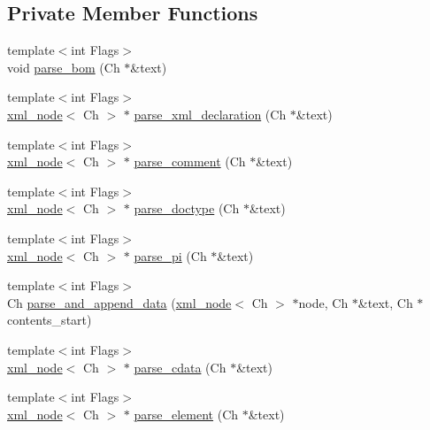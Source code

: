 \subsection*{Private Member Functions}
\begin{DoxyCompactItemize}
\item 
{\footnotesize template$<$int Flags$>$ }\\void \hyperlink{singletonrapidxml_1_1xml__document_aaa63a0c7b57ab8fce63d4aebe4da123d}{parse\+\_\+bom} (Ch $\ast$\&text)
\item 
{\footnotesize template$<$int Flags$>$ }\\\hyperlink{singletonrapidxml_1_1xml__node}{xml\+\_\+node}$<$ Ch $>$ $\ast$ \hyperlink{singletonrapidxml_1_1xml__document_a0151c52c82ba79ea0605c2facf39c534}{parse\+\_\+xml\+\_\+declaration} (Ch $\ast$\&text)
\item 
{\footnotesize template$<$int Flags$>$ }\\\hyperlink{singletonrapidxml_1_1xml__node}{xml\+\_\+node}$<$ Ch $>$ $\ast$ \hyperlink{singletonrapidxml_1_1xml__document_abc287ce83bcb2dc8519e300236004591}{parse\+\_\+comment} (Ch $\ast$\&text)
\item 
{\footnotesize template$<$int Flags$>$ }\\\hyperlink{singletonrapidxml_1_1xml__node}{xml\+\_\+node}$<$ Ch $>$ $\ast$ \hyperlink{singletonrapidxml_1_1xml__document_a4c613f3a928f763b4c788422edda5860}{parse\+\_\+doctype} (Ch $\ast$\&text)
\item 
{\footnotesize template$<$int Flags$>$ }\\\hyperlink{singletonrapidxml_1_1xml__node}{xml\+\_\+node}$<$ Ch $>$ $\ast$ \hyperlink{singletonrapidxml_1_1xml__document_a09e12a4233a07387d4b5a5ad239388aa}{parse\+\_\+pi} (Ch $\ast$\&text)
\item 
{\footnotesize template$<$int Flags$>$ }\\Ch \hyperlink{singletonrapidxml_1_1xml__document_aec6cedf45179b6378c670bc3ea509e61}{parse\+\_\+and\+\_\+append\+\_\+data} (\hyperlink{singletonrapidxml_1_1xml__node}{xml\+\_\+node}$<$ Ch $>$ $\ast$node, Ch $\ast$\&text, Ch $\ast$contents\+\_\+start)
\item 
{\footnotesize template$<$int Flags$>$ }\\\hyperlink{singletonrapidxml_1_1xml__node}{xml\+\_\+node}$<$ Ch $>$ $\ast$ \hyperlink{singletonrapidxml_1_1xml__document_ab94daeb25e8a1609e31210a45b2afa6c}{parse\+\_\+cdata} (Ch $\ast$\&text)
\item 
{\footnotesize template$<$int Flags$>$ }\\\hyperlink{singletonrapidxml_1_1xml__node}{xml\+\_\+node}$<$ Ch $>$ $\ast$ \hyperlink{singletonrapidxml_1_1xml__document_aea385acd096ab200d63a777d53435ada}{parse\+\_\+element} (Ch $\ast$\&text)

\end{DoxyCompactItemize}
